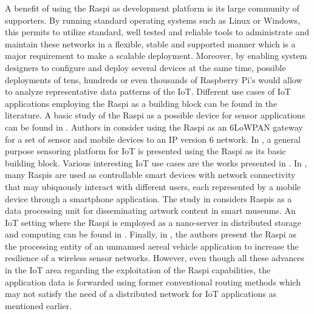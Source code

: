 A benefit of using the \ac{Raspi} as development platform is its large
community of supporters. By running standard operating systems such as
Linux or Windows, this permits to utilize standard, well tested and
reliable tools to administrate and maintain these networks in
a flexible, stable and supported manner which is a major requirement
to make a scalable deployment. Moreover, by enabling system designers to
configure and deploy several devices at the same time, possible deployments
of tens, hundreds or even thousands of Raspberry Pi's would allow to
analyze representative data patterns of the \ac{IoT}. Different use cases of
\ac{IoT} applications employing the \ac{Raspi} as a building block can be found
in the literature. A basic study of the \ac{Raspi} as a possible device
for sensor applications can be found in \cite{vujovic2014raspberry}.
Authors in \cite{kruger2015rapid} consider using the \ac{Raspi} as an
\ac{6LoWPAN} gateway for a set of sensor and mobile devices to an
\ac{IP} version 6 network. In \cite{mahmoud2016sensorian}, a general
purpose sensoring platform for \ac{IoT} is presented using the \ac{Raspi}
as its basic building block. Various interesting \ac{IoT} use cases
are the works presented in \cite{wirz2015enabling,alletto2016indoor,
jalali2016fog,ueyama2014exploiting}. In \cite{wirz2015enabling}, many
\ac{Raspi}s are used as controllable smart devices
with network connectivity that may ubiquously interact with different users,
each represented by a mobile device through a smartphone application.
The study in \cite{alletto2016indoor} considers \ac{Raspi}s as a data
processing unit for disseminating artwork content in smart museums.
An \ac{IoT} setting where the \ac{Raspi} is employed as a nano-server
in distributed storage and computing can be found in \cite{jalali2016fog}.
Finally, in \cite{ueyama2014exploiting}, the authors present
the \ac{Raspi} as the processing entity of an unmanned aereal
vehicle application to increase the resilience of a wireless sensor networks.
However, even though all these advances in the \ac{IoT} area regarding
the exploitation of the \ac{Raspi} capabilities, the application data
is forwarded using former conventional routing methods which may
not satisfy the need of a distributed network for \ac{IoT}
applications as mentioned earlier.

